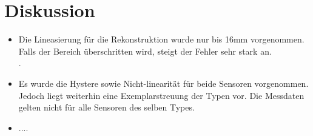 \section{Diskussion}
\begin{itemize}
    \item Die Lineasierung für die Rekonstruktion wurde nur bis 16mm vorgenommen. Falls der Bereich überschritten wird, steigt der Fehler sehr stark an.\\.
    \item Es wurde die Hystere sowie Nicht-linearität für beide Sensoren vorgenommen. Jedoch liegt weiterhin eine Exemplarstreuung der Typen vor. Die Messdaten gelten nicht für alle Sensoren des selben Types.
    \item ....
\end{itemize}
      
\clearpage